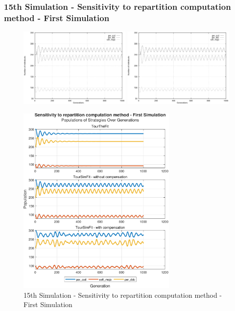 \documentclass[12pt]{article}
\begin{document}
\subsubsection{15th Simulation - Sensitivity to repartition computation method - First Simulation}
	\begin{figure}[h]
	    \centering
		\includegraphics[width=0.49\textwidth]{RefPaperFigures/fig11a.jpeg}
		\includegraphics[width=0.49\textwidth]{RefPaperFigures/fig11a.jpeg}\par\vspace{0.5em}\par\vspace{0.5em}
	    \includegraphics[width=0.7\textwidth]{Sensitivity to repartition computation method - First Simulation.pdf}
	    \caption{15th Simulation - Sensitivity to repartition computation method - First Simulation}
	    \label{fig:Monotonous Convergence}
	\end{figure}
\end{document}
